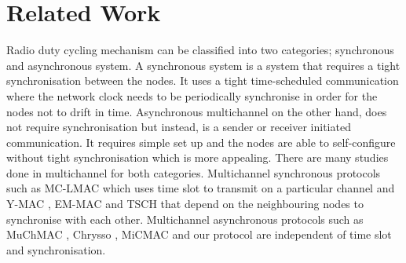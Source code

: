 \section{Related Work}
\label{sec:relatedwork}

Radio duty cycling mechanism can be classified into two categories; synchronous and asynchronous system. A synchronous system is a system that requires a tight synchronisation between the nodes. It uses a tight time-scheduled communication where the network clock needs to be periodically synchronise in order for the nodes not to drift in time. Asynchronous multichannel on the other hand, does not require synchronisation but instead, is a sender or receiver initiated communication. It requires simple set up and the nodes are able to self-configure without tight synchronisation which is more appealing. There are many studies done in multichannel for both categories. Multichannel synchronous protocols such as MC-LMAC \cite{mc-lmac} which uses time slot to transmit on a particular channel and Y-MAC \cite{y-mac}, EM-MAC \cite{emmac} and TSCH that depend on the neighbouring nodes to synchronise with each other. Multichannel asynchronous protocols such as MuChMAC \cite{muchmac}, Chrysso \cite{chrysso}, MiCMAC \cite{micmac} and our protocol are independent of time slot and synchronisation. 


